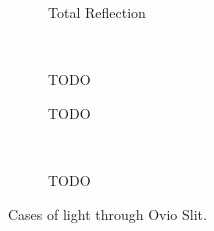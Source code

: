 \documentclass[crop,border=5,tikz,convert={outext=.svg,command=\unexpanded{pdf2svg
    \infile\space\outfile}},multi=false]{standalone}
\begin{document}
\begin{figure}[!h]
\centering
\begin{subfigure}[b]{0.45\textwidth}

\caption{Total Reflection}
\end{subfigure}
~
\begin{subfigure}[b]{0.45\textwidth}

\caption{TODO}
\end{subfigure}

\begin{subfigure}[b]{0.45\textwidth}

\caption{TODO}
\end{subfigure}
~
\begin{subfigure}[b]{0.45\textwidth}

\caption{TODO}
\end{subfigure}

\caption{Cases of light through Ovio Slit.}
\end{figure}
\end{document}
